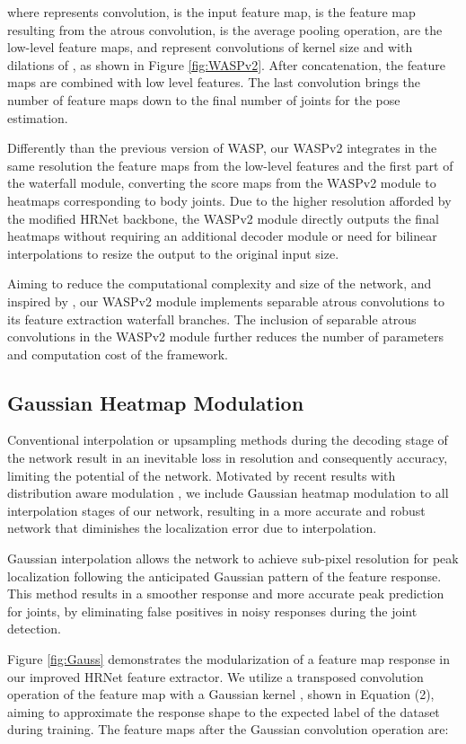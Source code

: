 \documentclass[10pt,twocolumn,letterpaper]{article}
\begin{document}
\noindent 
where  represents convolution,  is the input feature map,  is the feature map resulting from the  atrous convolution,  is the average pooling operation,  are the low-level feature maps,  and  represent convolutions of kernel size  and  with dilations of , as shown in Figure \ref{fig:WASPv2}. 
After concatenation, the feature maps are combined with low level features.
The last  convolution brings the number of feature maps down to the final number of joints for the pose estimation.

Differently than the previous version of WASP, our WASPv2 integrates in the same resolution the feature maps from the low-level features and the first part of the waterfall module, converting the score maps from the WASPv2 module to heatmaps corresponding to body joints.
Due to the higher resolution afforded by the modified HRNet backbone, the WASPv2 module directly outputs the final heatmaps without requiring an additional decoder module or need for bilinear interpolations to resize the output to the original input size.

Aiming to reduce the computational complexity and size of the network,
and inspired by \cite{DeepLabv3+}, 
our WASPv2 module implements separable atrous convolutions to its feature extraction waterfall branches. The inclusion of separable atrous convolutions in the WASPv2 module further reduces the number of parameters and computation cost of the framework.

\subsection{Gaussian Heatmap Modulation}
Conventional interpolation or upsampling methods during the decoding stage of the network result in an inevitable loss in resolution and consequently accuracy, limiting the potential of the network.
Motivated by recent results 
with distribution aware modulation \cite{DarkPose}, we include Gaussian heatmap modulation to all interpolation stages of our network,
resulting in a more accurate and robust network that diminishes the
localization error due to interpolation.


Gaussian interpolation allows the network to achieve sub-pixel resolution for peak localization following the anticipated Gaussian pattern of the feature response.
This method results in a smoother response and more accurate peak prediction for joints, by eliminating false positives in noisy responses during the joint detection.

Figure \ref{fig:Gauss} demonstrates the modularization of a feature map response in our improved HRNet feature extractor.
We utilize a transposed convolution operation of the feature map  with a Gaussian kernel , shown in Equation (2), aiming to approximate the response shape to the expected label of the dataset during training.
The feature maps  after the Gaussian convolution operation are:
\end{document}
